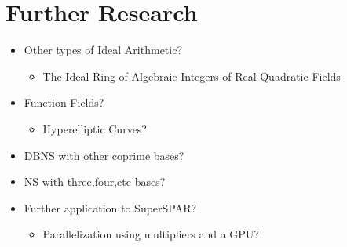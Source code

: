 \documentclass[11pt, letterpaper]{article}
\theoremstyle{definition}
\begin{document}
\section{Further Research}
\begin{itemize}
\item Other types of Ideal Arithmetic?
	\begin{itemize}
	\item The Ideal Ring of Algebraic Integers of Real Quadratic Fields
	\end{itemize}
\item Function Fields?
	\begin{itemize}
	\item Hyperelliptic Curves?
	\end{itemize}
\item DBNS with other coprime bases?
\item NS with three,four,etc bases?
\item Further application to SuperSPAR?
	\begin{itemize}
	\item Parallelization using multipliers and a GPU?
	\end{itemize}
\end{itemize}
\end{document}
